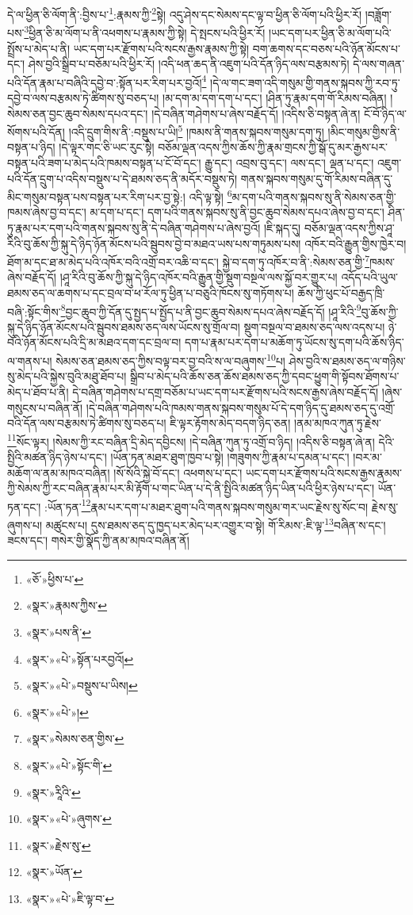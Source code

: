 དེ་ལ་ཕྱིན་ཅི་ལོག་ནི་:བྱིས་པ་\footnote{«ཅོ་»ཕྱིས་པ་}:རྣམས་ཀྱི་\footnote{«སྣར་»རྣམས་ཀྱིས་}སྟེ། འདུ་ཤེས་དང་སེམས་དང་ལྟ་བ་ཕྱིན་ཅི་ལོག་པའི་ཕྱིར་རོ། །བཟློག་པས་\footnote{«སྣར་»པས་ནི་}ཕྱིན་ཅི་མ་ལོག་པ་ནི་འཕགས་པ་རྣམས་ཀྱི་སྟེ། དེ་སྤངས་པའི་ཕྱིར་རོ། །ཡང་དག་པར་ཕྱིན་ཅི་མ་ལོག་པའི་སྤྲོས་པ་མེད་པ་ནི། ཡང་དག་པར་རྫོགས་པའི་སངས་རྒྱས་རྣམས་ཀྱི་སྟེ། བག་ཆགས་དང་བཅས་པའི་ཉོན་མོངས་པ་དང་། ཤེས་བྱའི་སྒྲིབ་པ་བཅོམ་པའི་ཕྱིར་རོ། །འདི་ཕན་ཆད་ནི་འཇུག་པའི་དོན་ཉིད་ལས་བརྩམས་ཏེ། དེ་ལས་གཞན་པའི་དོན་རྣམ་པ་བཞིའི་དབྱེ་བ་:སྟོན་པར་རིག་པར་བྱའོ།\footnote{«སྣར་»«པེ་»སྟོན་པརབྱའོ།} །དེ་ལ་གང་ཟག་འདི་གསུམ་གྱི་གནས་སྐབས་ཀྱི་རབ་ཏུ་དབྱེ་བ་ལས་བརྩམས་ཏེ་ཚིགས་སུ་བཅད་པ། །མ་དག་མ་དག་དག་པ་དང་། །ཤིན་ཏུ་རྣམ་དག་གོ་རིམས་བཞིན། །སེམས་ཅན་བྱང་ཆུབ་སེམས་དཔའ་དང་། །དེ་བཞིན་གཤེགས་པ་ཞེས་བརྗོད་དོ། །འདིས་ཅི་བསྟན་ཞེ་ན། ངོ་བོ་ཉིད་ལ་སོགས་པའི་དོན། །འདི་དྲུག་གིས་ནི་:བསྡུས་པ་ཡི།\footnote{«སྣར་»«པེ་»བསྡུས་པ་ཡིས།} །ཁམས་ནི་གནས་སྐབས་གསུམ་དག་ཏུ། །མིང་གསུམ་གྱིས་ནི་བསྟན་པ་ཉིད། །དེ་ལྟར་གང་ཅི་ཡང་རུང་སྟེ། བཅོམ་ལྡན་འདས་ཀྱིས་ཆོས་ཀྱི་རྣམ་གྲངས་ཀྱི་སྒོ་དུ་མར་རྒྱས་པར་བསྟན་པའི་ཟག་པ་མེད་པའི་ཁམས་བསྟན་པ་ངོ་བོ་དང་། རྒྱུ་དང་། འབྲས་བུ་དང་། ལས་དང་། ལྡན་པ་དང་། འཇུག་པའི་དོན་དྲུག་པ་འདིས་བསྡུས་པ་དེ་ཐམས་ཅད་ནི་མདོར་བསྡུས་ཏེ། གནས་སྐབས་གསུམ་དུ་གོ་རིམས་བཞིན་དུ་མིང་གསུམ་བསྟན་པས་བསྟན་པར་རིག་པར་བྱ་སྟེ:། འདི་ལྟ་སྟེ། \footnote{«སྣར་»«པེ་»།  }མ་དག་པའི་གནས་སྐབས་སུ་ནི་སེམས་ཅན་གྱི་ཁམས་ཞེས་བྱ་བ་དང་། མ་དག་པ་དང་། དག་པའི་གནས་སྐབས་སུ་ནི་བྱང་ཆུབ་སེམས་དཔའ་ཞེས་བྱ་བ་དང་། ཤིན་ཏུ་རྣམ་པར་དག་པའི་གནས་སྐབས་སུ་ནི་དེ་བཞིན་གཤེགས་པ་ཞེས་བྱའོ། །ཇི་སྐད་དུ། བཅོམ་ལྡན་འདས་ཀྱིས་ཤཱ་རིའི་བུ་ཆོས་ཀྱི་སྐུ་དེ་ཉིད་ཉོན་མོངས་པའི་སྦུབས་བྱེ་བ་མཐའ་ཡས་པས་གཏུམས་པས། འཁོར་བའི་རྒྱུན་གྱིས་ཁྱེར་བ། ཐོག་མ་དང་ཐ་མ་མེད་པའི་འཁོར་བའི་འགྲོ་བར་འཆི་བ་དང་། སྐྱེ་བ་དག་ཏུ་འཁོར་བ་ནི་:སེམས་ཅན་གྱི་\footnote{«སྣར་»སེམས་ཅན་གྱིས་}ཁམས་ཞེས་བརྗོད་དོ། །ཤཱ་རིའི་བུ་ཆོས་ཀྱི་སྐུ་དེ་ཉིད་འཁོར་བའི་རྒྱུན་གྱི་སྡུག་བསྔལ་ལས་སྐྱོ་བར་གྱུར་པ། འདོད་པའི་ཡུལ་ཐམས་ཅད་ལ་ཆགས་པ་དང་བྲལ་བ་ཕ་རོལ་ཏུ་ཕྱིན་པ་བཅུའི་ཁོངས་སུ་གཏོགས་པ། ཆོས་ཀྱི་ཕུང་པོ་བརྒྱད་ཁྲི་བཞི་:སྟོང་གིས་\footnote{«སྣར་»«པེ་»སྟོང་གི་}བྱང་ཆུབ་ཀྱི་དོན་དུ་སྤྱད་པ་སྤྱོད་པ་ནི་བྱང་ཆུབ་སེམས་དཔའ་ཞེས་བརྗོད་དོ། །ཤཱ་རིའི་\footnote{«སྣར་»རཱིའི་}བུ་ཆོས་ཀྱི་སྐུ་དེ་ཉིད་ཉོན་མོངས་པའི་སྦུབས་ཐམས་ཅད་ལས་ཡོངས་སུ་གྲོལ་བ། སྡུག་བསྔལ་བ་ཐམས་ཅད་ལས་འདས་པ། ཉེ་བའི་ཉོན་མོངས་པའི་དྲི་མ་མཐའ་དག་དང་བྲལ་བ། དག་པ་རྣམ་པར་དག་པ་མཆོག་ཏུ་ཡོངས་སུ་དག་པའི་ཆོས་ཉིད་ལ་གནས་པ། སེམས་ཅན་ཐམས་ཅད་ཀྱིས་བལྟ་བར་བྱ་བའི་ས་ལ་བཞུགས་\footnote{«སྣར་»«པེ་»ཞུགས་}པ། ཤེས་བྱའི་ས་ཐམས་ཅད་ལ་གཉིས་སུ་མེད་པའི་སྐྱེས་བུའི་མཐུ་ཐོབ་པ། སྒྲིབ་པ་མེད་པའི་ཆོས་ཅན་ཆོས་ཐམས་ཅད་ཀྱི་དབང་ཕྱུག་གི་སྟོབས་ཐོགས་པ་མེད་པ་ཐོབ་པ་ནི། དེ་བཞིན་གཤེགས་པ་དགྲ་བཅོམ་པ་ཡང་དག་པར་རྫོགས་པའི་སངས་རྒྱས་ཞེས་བརྗོད་དོ། །ཞེས་གསུངས་པ་བཞིན་ནོ། །དེ་བཞིན་གཤེགས་པའི་ཁམས་གནས་སྐབས་གསུམ་པོ་དེ་དག་ཉིད་དུ་ཐམས་ཅད་དུ་འགྲོ་བའི་དོན་ལས་བརྩམས་ཏེ་ཚིགས་སུ་བཅད་པ། ཇི་ལྟར་རྟོགས་མེད་བདག་ཉིད་ཅན། །ནམ་མཁའ་ཀུན་ཏུ་རྗེས་\footnote{«སྣར་»རྗེས་སུ་}སོང་ལྟར། །སེམས་ཀྱི་རང་བཞིན་དྲི་མེད་དབྱིངས། །དེ་བཞིན་ཀུན་ཏུ་འགྲོ་བ་ཉིད། །འདིས་ཅི་བསྟན་ཞེ་ན། དེའི་སྤྱིའི་མཚན་ཉིད་ཉེས་པ་དང་། །ཡོན་ཏན་མཐར་ཐུག་ཁྱབ་པ་སྟེ། །གཟུགས་ཀྱི་རྣམ་པ་དམན་པ་དང་། །བར་མ་མཆོག་ལ་ནམ་མཁའ་བཞིན། །སོ་སོའི་སྐྱེ་བོ་དང་། འཕགས་པ་དང་། ཡང་དག་པར་རྫོགས་པའི་སངས་རྒྱས་རྣམས་ཀྱི་སེམས་ཀྱི་རང་བཞིན་རྣམ་པར་མི་རྟོག་པ་གང་ཡིན་པ་དེ་ནི་སྤྱིའི་མཚན་ཉིད་ཡིན་པའི་ཕྱིར་ཉེས་པ་དང་། ཡོན་ཏན་དང་། :ཡོན་ཏན་\footnote{«སྣར་»ཡོན་}རྣམ་པར་དག་པ་མཐར་ཐུག་པའི་གནས་སྐབས་གསུམ་གར་ཡང་རྗེས་སུ་སོང་བ། རྗེས་སུ་ཞུགས་པ། མཚུངས་པ། དུས་ཐམས་ཅད་དུ་ཁྱད་པར་མེད་པར་འགྱུར་བ་སྟེ། གོ་རིམས་:ཇི་ལྟ་\footnote{«སྣར་»«པེ་»ཇི་ལྟ་བ་}བཞིན་ས་དང་། ཟངས་དང་། གསེར་གྱི་སྣོད་ཀྱི་ནམ་མཁའ་བཞིན་ནོ། 